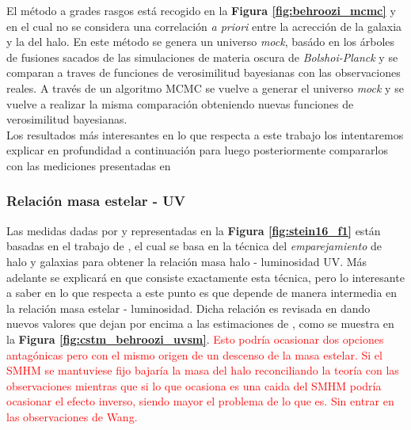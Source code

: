 El método a grades rasgos está recogido en la \textbf{Figura \ref{fig:behroozi_mcmc}} y en  el cual no se considera una correlación \textit{a priori} entre la acrección de la galaxia y la del halo. En este método se genera un universo \textit{mock}, basádo en los árboles de fusiones sacados de las simulaciones de materia oscura de \textit{Bolshoi-Planck} y se comparan a traves de funciones de verosimilitud bayesianas con las observaciones reales. A través de un algoritmo MCMC se vuelve a generar el universo \textit{mock} y se vuelve a realizar la misma comparación obteniendo nuevas funciones de verosimilitud bayesianas. \\

Los resultados más interesantes en lo que respecta a este trabajo los intentaremos explicar en profundidad a continuación para luego posteriormente compararlos con las mediciones presentadas en \cite{steinhardt2016impossibly}

\subsubsection{Relación masa estelar - UV} 
Las medidas dadas por \cite{bouwens2015reionization} y \cite{bouwens2015uv} representadas en la \textbf{Figura \ref{fig:stein16_f1}} están basadas en el trabajo de \cite{finkelstein2015increasing}, el cual se basa en la técnica del \textit{emparejamiento} de halo y galaxias para obtener la relación masa halo - luminosidad UV. Más adelante se explicará en que consiste exactamente esta técnica, pero lo interesante a saber en lo que respecta a este punto es que depende de manera intermedia en la relación masa estelar - luminosidad. Dicha relación es revisada en \cite{behroozi2019universemachine} dando nuevos valores que dejan por encima a las estimaciones de \cite{finkelstein2015increasing},\cite{finkelstein2015evolution} como se muestra en la \textbf{Figura \ref{fig:cstm_behroozi_uvsm}}.  \textcolor{red}{Esto podría ocasionar dos opciones antagónicas pero con el mismo origen de un descenso de la masa estelar. Si el SMHM se mantuviese fijo bajaría la masa del halo reconciliando la teoría con las observaciones mientras que si lo que ocasiona es una caida del SMHM podría ocasionar el efecto inverso, siendo mayor el problema de lo que es. Sin entrar en las observaciones de Wang. }
 
